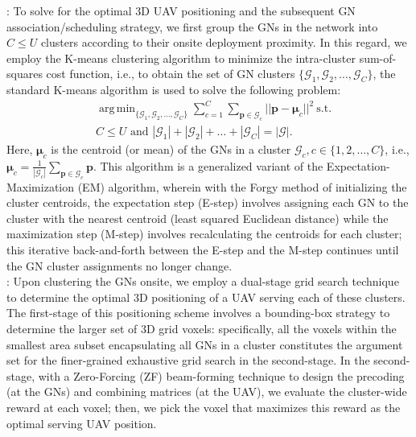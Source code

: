 \documentclass[10pt, twocolumn]{IEEEtran}
\DeclareMathOperator*{\argmin}{arg\,min}
\begin{document}
: To solve for the optimal $3$D UAV positioning and the subsequent GN association/scheduling strategy, we first group the GNs in the network into $C{\leq}U$ clusters according to their onsite deployment proximity. In this regard, we employ the K-means clustering algorithm to minimize the intra-cluster sum-of-squares cost function, i.e., to obtain the set of GN clusters $\{\mathcal{G}_{1},\mathcal{G}_{2},{\dots},\mathcal{G}_{C}\}$, the standard K-means algorithm is used to solve the following problem:
\begin{align}\label{Clustering}
    &\argmin_{\{\mathcal{G}_{1},\mathcal{G}_{2},{\dots},\mathcal{G}_{C}\}} \sum_{c = 1}^{C} \sum_{\mathbf{p} \in \mathcal{G}_{c}} ||\mathbf{p} - \boldsymbol{\mu}_{c}||^{2}\ \text{s.t.}\\
    &C \leq U \text { and } |\mathcal{G}_{1}| + |\mathcal{G}_{2}| + \dots + |\mathcal{G}_{C}| = |\mathcal{G}|.\nonumber
\end{align}
Here, $\boldsymbol{\mu}_{c}$ is the centroid (or mean) of the GNs in a cluster $\mathcal{G}_{c}, c{\in}\{1,2,{\dots},C\}$, i.e., $\boldsymbol{\mu}_{c}{=}\frac{1}{|\mathcal{G}_{c}|}\sum_{\mathbf{p}{\in}\mathcal{G}_{c}}\mathbf{p}$. This algorithm is a generalized variant of the Expectation-Maximization (EM) algorithm, wherein with the Forgy method of initializing the cluster centroids, the expectation step (E-step) involves assigning each GN to the cluster with the nearest centroid (least squared Euclidean distance) while the maximization step (M-step) involves recalculating the centroids for each cluster; this iterative back-and-forth between the E-step and the M-step continues until the GN cluster assignments no longer change.\\
: Upon clustering the GNs onsite, we employ a dual-stage grid search technique to determine the optimal $3$D positioning of a UAV serving each of these clusters. The first-stage of this positioning scheme involves a bounding-box strategy to determine the larger set of $3$D grid voxels: specifically, all the voxels within the smallest area subset encapsulating all GNs in a cluster constitutes the argument set for the finer-grained exhaustive grid search in the second-stage. In the second-stage, with a Zero-Forcing (ZF) beam-forming technique to design the precoding (at the GNs) and combining matrices (at the UAV), we evaluate the cluster-wide reward at each voxel; then, we pick the voxel that maximizes this reward as the optimal serving UAV position.\\
\end{document}
